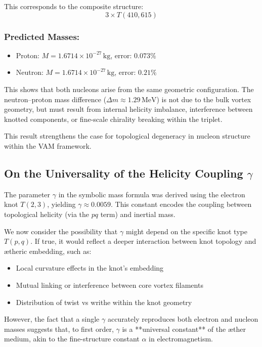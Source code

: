 \documentclass[11pt]{article}
\begin{document}
    This corresponds to the composite structure:
    \[
        \boxed{3 \times T(410, 615)}
    \]

    \subsubsection*{Predicted Masses:}
    \begin{itemize}
        \item Proton: \( M = 1.6714 \times 10^{-27} \, \text{kg} \), error: \( 0.073\% \)
        \item Neutron: \( M = 1.6714 \times 10^{-27} \, \text{kg} \), error: \( 0.21\% \)
    \end{itemize}

    This shows that both nucleons arise from the same geometric configuration. The neutron–proton mass difference (\( \Delta m \approx 1.29 \, \text{MeV} \)) is not due to the bulk vortex geometry, but must result from internal helicity imbalance, interference between knotted components, or fine-scale chirality breaking within the triplet.

    This result strengthens the case for topological degeneracy in nucleon structure within the VAM framework.

    \subsection*{On the Universality of the Helicity Coupling \( \gamma \)}
    The parameter \( \gamma \) in the symbolic mass formula was derived using the electron knot \( T(2,3) \), yielding \( \gamma \approx 0.0059 \). This constant encodes the coupling between topological helicity (via the \( pq \) term) and inertial mass.

    We now consider the possibility that \( \gamma \) might depend on the specific knot type \( T(p,q) \). If true, it would reflect a deeper interaction between knot topology and ætheric embedding, such as:
    \begin{itemize}
        \item Local curvature effects in the knot's embedding
        \item Mutual linking or interference between core vortex filaments
        \item Distribution of twist vs writhe within the knot geometry
    \end{itemize}

    However, the fact that a single \( \gamma \) accurately reproduces both electron and nucleon masses suggests that, to first order, \( \gamma \) is a **universal constant** of the æther medium, akin to the fine-structure constant \( \alpha \) in electromagnetism.
\end{document}
